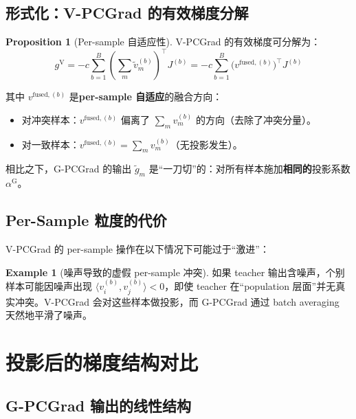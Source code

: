 \documentclass[11pt,a4paper]{article}
\theoremstyle{definition}
\newtheorem{proposition}{Proposition}
\newtheorem{example}{Example}
\begin{document}
\subsection{形式化：V-PCGrad 的有效梯度分解}

\begin{proposition}[Per-sample 自适应性]
V-PCGrad 的有效梯度可分解为：
\begin{equation}
g^{\mathrm{V}} = -c\sum_{b=1}^B \left(\sum_m \tilde{v}_m^{(b)}\right)^\top J^{(b)}
= -c\sum_{b=1}^B \bigl(v^{\mathrm{fused},(b)}\bigr)^\top J^{(b)}
\end{equation}

其中 $v^{\mathrm{fused},(b)}$ 是\textbf{per-sample 自适应}的融合方向：
\begin{itemize}
\item 对冲突样本：$v^{\mathrm{fused},(b)}$ 偏离了 $\sum_m v_m^{(b)}$ 的方向（去除了冲突分量）。
\item 对一致样本：$v^{\mathrm{fused},(b)} = \sum_m v_m^{(b)}$（无投影发生）。
\end{itemize}

相比之下，G-PCGrad 的输出 $\tilde{g}_m$ 是``一刀切''的：对所有样本施加\textbf{相同的}投影系数 $\alpha^{\mathrm{G}}$。
\end{proposition}

\subsection{Per-Sample 粒度的代价}

V-PCGrad 的 per-sample 操作在以下情况下可能过于``激进''：

\begin{example}[噪声导致的虚假 per-sample 冲突]
如果 teacher 输出含噪声，个别样本可能因噪声出现 $\langle v_i^{(b)}, v_j^{(b)}\rangle < 0$，即使 teacher 在``population 层面''并无真实冲突。V-PCGrad 会对这些样本做投影，而 G-PCGrad 通过 batch averaging 天然地平滑了噪声。
\end{example}

\section{投影后的梯度结构对比}
\label{sec:output_structure}

\subsection{G-PCGrad 输出的线性结构}
\end{document}
